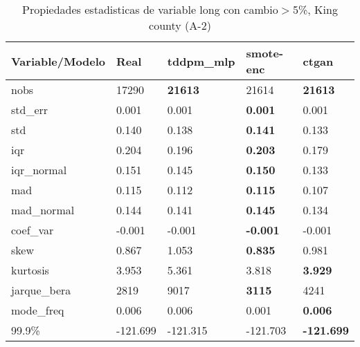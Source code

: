 \begin{table}[H]
\centering
\fontsize{8}{14}\selectfont
\caption{Propiedades estadisticas de variable long con cambio\ensuremath{>}5\%, King county (A-2)}
\label{table-stats-king county-a-2-long-short}
\begin{tabular}{|l|m{10em}|m{10em}|m{10em}|m{10em}|}
\hline
 \rowcolor[gray]{0.8}
Variable/Modelo & Real & tddpm\_mlp & smote-enc & ctgan \\
\hline nobs & 17290 & \bfseries 21613 & \cellcolor[rgb]{0.9, 0.54, 0.52} 21614 & \bfseries 21613 \\
\hline std\_err & 0.001 & 0.001 & \bfseries 0.001 & \cellcolor[rgb]{0.9, 0.54, 0.52} 0.001 \\
\hline std & 0.140 & 0.138 & \bfseries 0.141 & \cellcolor[rgb]{0.9, 0.54, 0.52} 0.133 \\
\hline iqr & 0.204 & 0.196 & \bfseries 0.203 & \cellcolor[rgb]{0.9, 0.54, 0.52} 0.179 \\
\hline iqr\_normal & 0.151 & 0.145 & \bfseries 0.150 & \cellcolor[rgb]{0.9, 0.54, 0.52} 0.133 \\
\hline mad & 0.115 & 0.112 & \bfseries 0.115 & \cellcolor[rgb]{0.9, 0.54, 0.52} 0.107 \\
\hline mad\_normal & 0.144 & 0.141 & \bfseries 0.145 & \cellcolor[rgb]{0.9, 0.54, 0.52} 0.134 \\
\hline coef\_var & -0.001 & -0.001 & \bfseries -0.001 & \cellcolor[rgb]{0.9, 0.54, 0.52} -0.001 \\
\hline skew & 0.867 & \cellcolor[rgb]{0.9, 0.54, 0.52} 1.053 & \bfseries 0.835 & 0.981 \\
\hline kurtosis & 3.953 & \cellcolor[rgb]{0.9, 0.54, 0.52} 5.361 & 3.818 & \bfseries 3.929 \\
\hline jarque\_bera & 2819 & \cellcolor[rgb]{0.9, 0.54, 0.52} 9017 & \bfseries 3115 & 4241 \\
\hline mode\_freq & 0.006 & 0.006 & \cellcolor[rgb]{0.9, 0.54, 0.52} 0.001 & \bfseries 0.006 \\
\hline 99.9\% & -121.699 & \cellcolor[rgb]{0.9, 0.54, 0.52} -121.315 & -121.703 & \bfseries -121.699 \\
\hline
\end{tabular}
\end{table}
